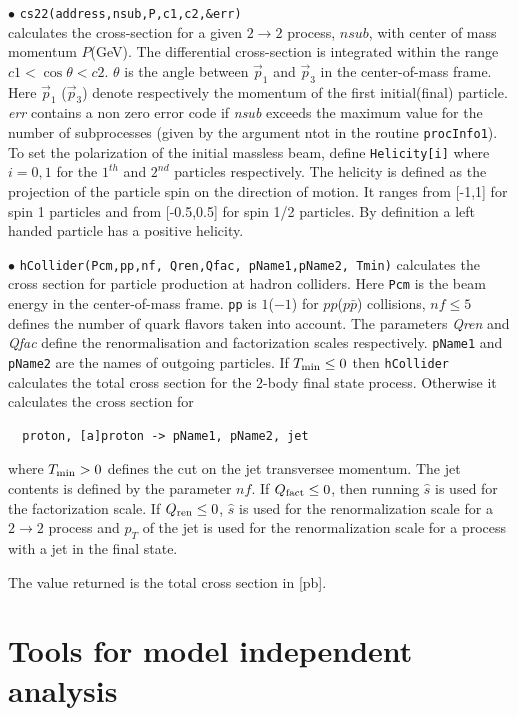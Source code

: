 \documentclass[12pt,a4paper]{article}
\begin{document}
\noindent
$\bullet$ \verb|cs22(address,nsub,P,c1,c2,&err)|\\
calculates  the cross-section for a given $2\rightarrow 2$
process, $nsub$, with  center of mass momentum $P$(GeV). The
differential cross-section is integrated
 within the range  $ c1 < \cos\theta <c2 $. $\theta$ is
the angle between $\vec{p}_1$ and $\vec{p}_3$  in the
center-of-mass frame. Here $\vec{p}_1$ ($\vec{p}_3$) denote
respectively the momentum of the first initial(final) particle.
{\it err} contains a non zero error code if {\it nsub} exceeds the
maximum value  for the number of subprocesses (given by the
argument ntot in the routine {\tt procInfo1}). To set the polarization 
of the initial massless beam, define   \verb|Helicity[i]|  where $i=0,1$ 
for the $1^{th}$ and $2^{nd}$ particles respectively.
The   helicity is defined as the projection of the particle spin
on the direction of motion. It ranges from  [-1,1] for spin 1 particles and 
from [-0.5,0.5]  for spin 1/2 particles.
By definition a left handed particle has a positive
helicity. 


\noindent$\bullet$ \verb|hCollider(Pcm,pp,nf, Qren,Qfac, pName1,pName2, Tmin)| 
calculates the cross
section for particle production at hadron colliders. Here \verb|Pcm| 
is the beam energy  in the center-of-mass frame. \verb|pp| is
$1$($-1$) for $pp$($p\bar{p}$) collisions, $ nf \le 5$  defines the
number of quark flavors taken into account.
The parameters  {\it Qren} and  {\it Qfac} define the renormalisation and factorization
 scales respectively. {\tt pName1} and {\tt pName2} are the names of outgoing
particles. If $T_{\rm min} \le 0 $ then {\tt hCollider} calculates the total  
cross section for the 2-body final state  process. Otherwise it calculates the cross
section for
\begin{verbatim}
  proton, [a]proton -> pName1, pName2, jet
\end{verbatim} 
where $ T_{\rm min}>0 $  defines the cut on the  jet transversee momentum. 
The jet contents is defined by the  parameter $nf$. 
If $Q_{\rm fact} \le 0 $, then  running  $\hat{s}$ is used for the
factorization  scale. If  $Q_{\rm ren} \le 0 $,  
$\hat{s}$ is used for the renormalization scale for a $2\to2$ process and $p_{T}$ of the jet is used for the renormalization scale for a process with a jet in the final state.

 The value returned  is the total  cross section in [pb]. 



\section{Tools for model independent analysis}
\end{document}
